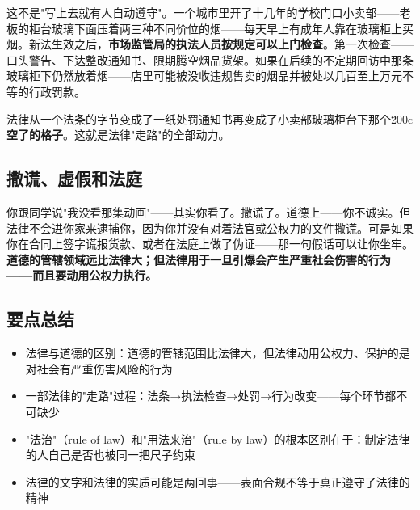 \documentclass[a4paper,12pt]{ctexart}
\begin{document}
这不是"写上去就有人自动遵守"。一个城市里开了十几年的学校门口小卖部——老板的柜台玻璃下面压着两三种不同价位的烟——每天早上有成年人靠在玻璃柜上买烟。新法生效之后，\textbf{市场监管局的执法人员按规定可以上门检查}。第一次检查——口头警告、下达整改通知书、限期腾空烟品货架。如果在后续的不定期回访中那条玻璃柜下仍然放着烟——店里可能被没收违规售卖的烟品并被处以几百至上万元不等的行政罚款。

法律从一个法条的字节变成了一纸处罚通知书再变成了小卖部玻璃柜台下那个\u200c\textbf{空了的格子}。这就是法律"走路"的全部动力。

\subsection*{撒谎、虚假和法庭}

你跟同学说"我没看那集动画"——其实你看了。撒谎了。道德上——你不诚实。但法律不会进你家来逮捕你，因为你并没有对着法官或公权力的文件撒谎。可是如果你在合同上签字谎报货款、或者在法庭上做了伪证——那一句假话可以让你坐牢。\textbf{道德的管辖领域远比法律大；但法律用于一旦引爆会产生严重社会伤害的行为——而且要动用公权力执行。}


\subsection*{要点总结}
\begin{itemize}
  \item 法律与道德的区别：道德的管辖范围比法律大，但法律动用公权力、保护的是对社会有严重伤害风险的行为
  \item 一部法律的"走路"过程：法条→执法检查→处罚→行为改变——每个环节都不可缺少
  \item "法治"（rule of law）和"用法来治"（rule by law）的根本区别在于：制定法律的人自己是否也被同一把尺子约束
  \item 法律的文字和法律的实质可能是两回事——表面合规不等于真正遵守了法律的精神
\end{itemize}
\end{document}
